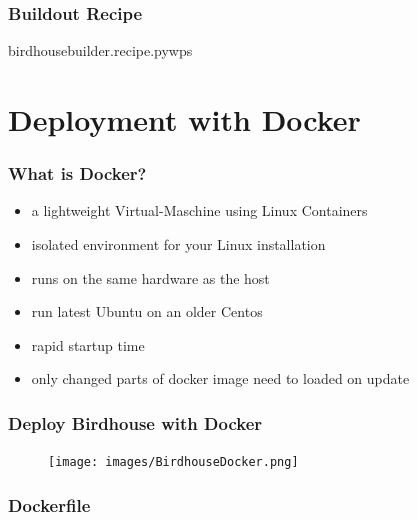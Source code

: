 \documentclass{beamer}
\begin{document}
  \begin{frame}[shrink]
    \frametitle{Buildout Recipe}
    \begin{block}{birdhousebuilder.recipe.pywps}
      
    \end{block}
\end{frame}


  \section{Deployment with Docker}


  \begin{frame}
    \frametitle{What is Docker?}
    \begin{itemize}
      \item a lightweight Virtual-Maschine using Linux Containers
      \item isolated environment for your Linux installation
      \item runs on the same hardware as the host
      \item run latest Ubuntu on an older Centos
      \item rapid startup time
      \item only changed parts of docker image need to loaded on update
    \end{itemize}
  \end{frame}


  \begin{frame}[plain]
    \frametitle{Deploy Birdhouse with Docker}
    \begin{figure}
      \texttt{[image: images/BirdhouseDocker.png]}
    \end{figure}
  \end{frame}


  \begin{frame}
    \frametitle{Dockerfile}
    
\end{frame}

\end{document}

